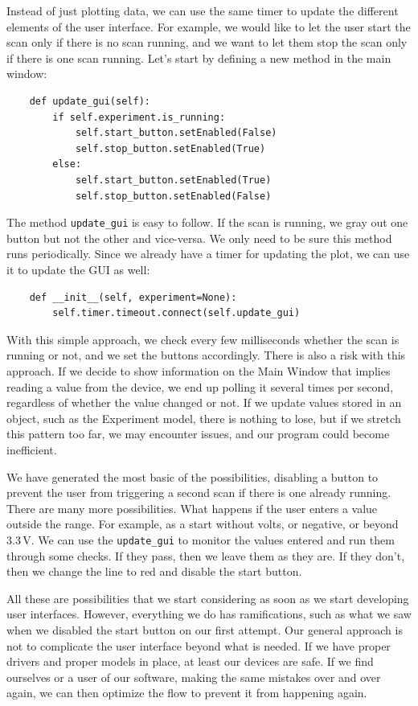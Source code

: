 Instead of just plotting data, we can use the same timer to update the different elements of the user interface. For example, we would like to let the user start the scan only if there is no scan running, and we want to let them stop the scan only if there is one scan running. Let's start by defining a new method in the main window:

\begin{verbatim}
    def update_gui(self):
        if self.experiment.is_running:
            self.start_button.setEnabled(False)
            self.stop_button.setEnabled(True)
        else:
            self.start_button.setEnabled(True)
            self.stop_button.setEnabled(False)
\end{verbatim}

The method \texttt{update\_gui} is easy to follow. If the scan is running, we gray out one button but not the other and vice-versa. We only need to be sure this method runs periodically. Since we already have a timer for updating the plot, we can use it to update the GUI as well:

\begin{verbatim}
    def __init__(self, experiment=None):
        self.timer.timeout.connect(self.update_gui)
\end{verbatim}

With this simple approach, we check every few milliseconds whether the scan is running or not, and we set the buttons accordingly. There is also a risk with this approach. If we decide to show information on the Main Window that implies reading a value from the device, we end up polling it several times per second, regardless of whether the value changed or not. If we update values stored in an object, such as the Experiment model, there is nothing to lose, but if we stretch this pattern too far, we may encounter issues, and our program could become inefficient.

We have generated the most basic of the possibilities, disabling a button to prevent the user from triggering a second scan if there is one already running. There are many more possibilities. What happens if the user enters a value outside the range. For example, as a start without volts, or negative, or beyond $3.3\,\textrm{V}$. We can use the \texttt{update\_gui} to monitor the values entered and run them through some checks. If they pass, then we leave them as they are. If they don't, then we change the line to red and disable the start button.

All these are possibilities that we start considering as soon as we start developing user interfaces. However, everything we do has ramifications, such as what we saw when we disabled the start button on our first attempt. Our general approach is not to complicate the user interface beyond what is needed. If we have proper drivers and proper models in place, at least our devices are safe. If we find ourselves or a user of our software, making the same mistakes over and over again, we can then optimize the flow to prevent it from happening again.

